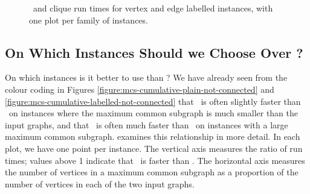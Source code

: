 \begin{figure}[htb]
{        \label{figure:mcs33ved-runtime-mcsplitdown-clique-bv}
    }
    \caption{\McSplitDown\ and clique run times for vertex and edge labelled instances, with one plot per family of instances.}
    \label{figure:mcs33ved-runtime-mcsplitdown-clique-scatters}
\end{figure}


\FloatBarrier


\subsection{On Which Instances Should we Choose \McSplit{$\downarrow$}
    Over \McSplit?}\label{sec:which-mcsplit-down}

On which instances is it better to use \McSplit{$\downarrow$} than \McSplit?
We have already seen from the colour coding in Figures
\ref{figure:mcs-cumulative-plain-not-connected} and
\ref{figure:mcs-cumulative-labelled-not-connected}
that \McSplit\ is often slightly faster than \McSplitDown\ on instances where
the maximum common subgraph is much smaller than the input graphs, and that
\McSplitDown\ is often much faster than \McSplit\ on instances with a large
maximum common subgraph.  
examines this relationship in more detail.  In each plot, we have one
point per instance.  The vertical axis measures the ratio of run times;
values above 1 indicate that \McSplitDown\ is faster than \McSplit.
The horizontal axis measures the number of vertices in a maximum
common subgraph as a proportion of the number of vertices in each
of the two input graphs.

